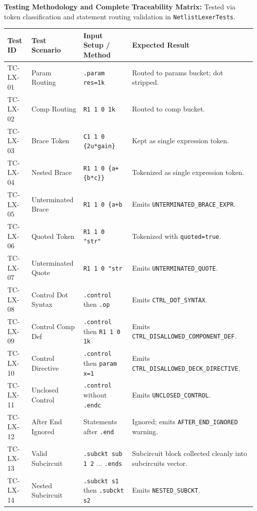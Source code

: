 \textbf{Testing Methodology and Complete Traceability Matrix:} Tested via token classification and statement routing validation in \texttt{NetlistLexerTests}.

\begin{table}[H]
\centering
\small
\begin{tabular}{|l|l|p{4.5cm}|p{4.5cm}|}
\hline
\textbf{Test ID} & \textbf{Test Scenario} & \textbf{Input Setup / Method} & \textbf{Expected Result} \\
\hline
TC-LX-01 & Param Routing & \texttt{.param res=1k} & Routed to params bucket; dot stripped. \\
\hline
TC-LX-02 & Comp Routing & \texttt{R1 1 0 1k} & Routed to comp bucket. \\
\hline
TC-LX-03 & Brace Token & \texttt{C1 1 0 \{2u*gain\}} & Kept as single expression token. \\
\hline
TC-LX-04 & Nested Brace & \texttt{R1 1 0 \{a+\{b*c\}\}} & Tokenized as single expression token. \\
\hline
TC-LX-05 & Unterminated Brace & \texttt{R1 1 0 \{a+b} & Emits \texttt{UNTERMINATED\_BRACE\_EXPR}. \\
\hline
TC-LX-06 & Quoted Token & \texttt{R1 1 0 "str"} & Tokenized with \texttt{quoted=true}. \\
\hline
TC-LX-07 & Unterminated Quote & \texttt{R1 1 0 "str} & Emits \texttt{UNTERMINATED\_QUOTE}. \\
\hline
TC-LX-08 & Control Dot Syntax & \texttt{.control} then \texttt{.op} & Emits \texttt{CTRL\_DOT\_SYNTAX}. \\
\hline
TC-LX-09 & Control Comp Def & \texttt{.control} then \texttt{R1 1 0 1k} & Emits \texttt{CTRL\_DISALLOWED\_COMPONENT\_DEF}. \\
\hline
TC-LX-10 & Control Directive & \texttt{.control} then \texttt{param x=1} & Emits \texttt{CTRL\_DISALLOWED\_DECK\_DIRECTIVE}. \\
\hline
TC-LX-11 & Unclosed Control & \texttt{.control} without \texttt{.endc} & Emits \texttt{UNCLOSED\_CONTROL}. \\
\hline
TC-LX-12 & After End Ignored & Statements after \texttt{.end} & Ignored; emits \texttt{AFTER\_END\_IGNORED} warning. \\
\hline
TC-LX-13 & Valid Subcircuit & \texttt{.subckt sub 1 2} ... \texttt{.ends} & Subcircuit block collected cleanly into subcircuits vector. \\
\hline
TC-LX-14 & Nested Subcircuit & \texttt{.subckt s1} then \texttt{.subckt s2} & Emits \texttt{NESTED\_SUBCKT}. \\

\end{tabular}
\end{table}
